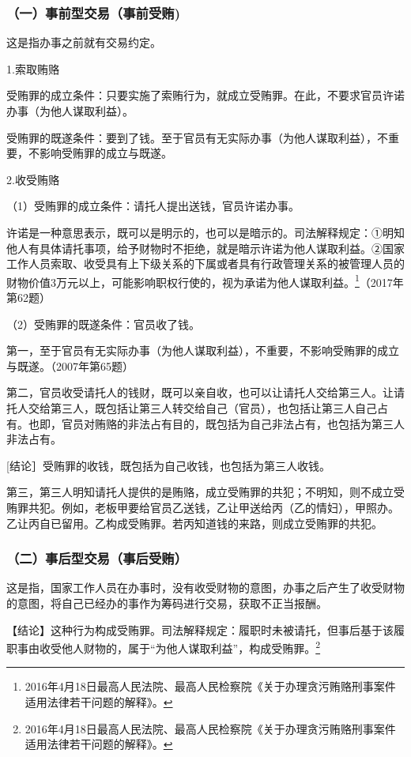 \subsubsection*{（一）事前型交易（事前受贿)}

这是指办事之前就有交易约定。

1.索取贿赂

受贿罪的成立条件：只要实施了索贿行为，就成立受贿罪。在此，不要求官员许诺办事（为他人谋取利益）。

受贿罪的既遂条件：要到了钱。至于官员有无实际办事（为他人谋取利益），不重要，不影响受贿罪的成立与既遂。

2.收受贿赂

（1）受贿罪的成立条件：请托人提出送钱，官员许诺办事。

许诺是一种意思表示，既可以是明示的，也可以是暗示的。司法解释规定：①明知他人有具体请托事项，给予财物时不拒绝，就是暗示许诺为他人谋取利益。②国家工作人员索取、收受具有上下级关系的下属或者具有行政管理关系的被管理人员的财物价值3万元以上，可能影响职权行使的，视为承诺为他人谋取利益。\footnote{2016年4月18日最高人民法院、最高人民检察院《关于办理贪污贿赂刑事案件适用法律若干问题的解释》。}（2017年第62题）

（2）受贿罪的既遂条件：官员收了钱。

第一，至于官员有无实际办事（为他人谋取利益），不重要，不影响受贿罪的成立与既遂。（2007年第65题）

第二，官员收受请托人的钱财，既可以亲自收，也可以让请托人交给第三人。让请托人交给第三人，既包括让第三人转交给自己（官员），也包括让第三人自己占有。也即，官员对贿赂的非法占有目的，既包括为自己非法占有，也包括为第三人非法占有。

[结论］受贿罪的收钱，既包括为自己收钱，也包括为第三人收钱。

第三，第三人明知请托人提供的是贿赂，成立受贿罪的共犯；不明知，则不成立受贿罪共犯。例如，老板甲要给官员乙送钱，乙让甲送给丙（乙的情妇），甲照办。乙让丙自已留用。乙构成受贿罪。若丙知道钱的来路，则成立受贿罪的共犯。

\subsubsection*{（二）事后型交易（事后受贿）}

这是指，国家工作人员在办事时，没有收受财物的意图，办事之后产生了收受财物的意图，将自己已经办的事作为筹码进行交易，获取不正当报酬。

【结论】这种行为构成受贿罪。司法解释规定：履职时未被请托，但事后基于该履职事由收受他人财物的，属于“为他人谋取利益”，构成受贿罪。\footnote{2016年4月18日最高人民法院、最高人民检察院《关于办理贪污贿赂刑事案件适用法律若干问题的解释》。}

